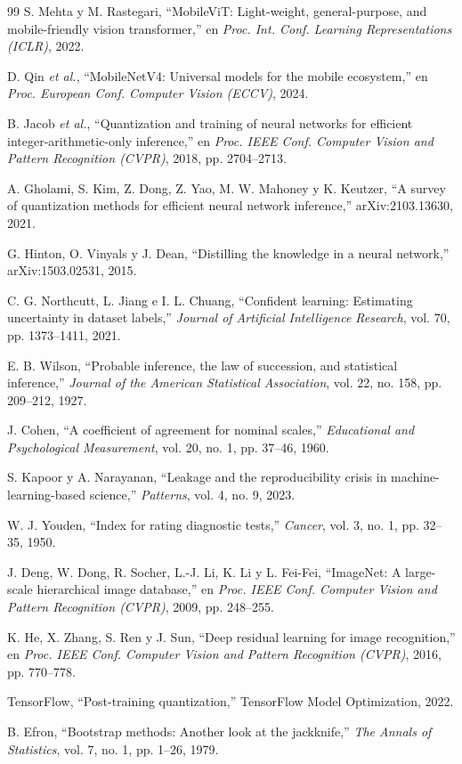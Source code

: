 \documentclass[conference]{IEEEtran}
\begin{document}
\begin{thebibliography}{99}
 S. Mehta y M. Rastegari, ``MobileViT: Light-weight, general-purpose, and mobile-friendly
vision transformer,'' en \emph{Proc. Int. Conf. Learning Representations (ICLR)}, 2022.

 D. Qin \emph{et al.}, ``MobileNetV4: Universal models for the mobile ecosystem,'' en \emph{Proc.
European Conf. Computer Vision (ECCV)}, 2024.

 B. Jacob \emph{et al.}, ``Quantization and training of neural networks for efficient
integer-arithmetic-only inference,'' en \emph{Proc. IEEE Conf. Computer Vision and Pattern Recognition (CVPR)},
2018, pp. 2704--2713.

 A. Gholami, S. Kim, Z. Dong, Z. Yao, M. W. Mahoney y K. Keutzer, ``A survey of quantization
methods for efficient neural network inference,'' arXiv:2103.13630, 2021.

 G. Hinton, O. Vinyals y J. Dean, ``Distilling the knowledge in a neural network,''
arXiv:1503.02531, 2015.

 C. G. Northcutt, L. Jiang e I. L. Chuang, ``Confident learning: Estimating uncertainty in
dataset labels,'' \emph{Journal of Artificial Intelligence Research}, vol. 70, pp. 1373--1411, 2021.

 E. B. Wilson, ``Probable inference, the law of succession, and statistical inference,''
\emph{Journal of the American Statistical Association}, vol. 22, no. 158, pp. 209--212, 1927.

 J. Cohen, ``A coefficient of agreement for nominal scales,'' \emph{Educational and
Psychological Measurement}, vol. 20, no. 1, pp. 37--46, 1960.

 S. Kapoor y A. Narayanan, ``Leakage and the reproducibility crisis in
machine-learning-based science,'' \emph{Patterns}, vol. 4, no. 9, 2023.

 W. J. Youden, ``Index for rating diagnostic tests,'' \emph{Cancer}, vol. 3, no. 1,
pp. 32--35, 1950.

 J. Deng, W. Dong, R. Socher, L.-J. Li, K. Li y L. Fei-Fei, ``ImageNet: A large-scale
hierarchical image database,'' en \emph{Proc. IEEE Conf. Computer Vision and Pattern Recognition (CVPR)}, 2009,
pp. 248--255.

 K. He, X. Zhang, S. Ren y J. Sun, ``Deep residual learning for image recognition,'' en
\emph{Proc. IEEE Conf. Computer Vision and Pattern Recognition (CVPR)}, 2016, pp. 770--778.

 TensorFlow, ``Post-training quantization,'' TensorFlow Model Optimization, 2022.

 B. Efron, ``Bootstrap methods: Another look at the jackknife,'' \emph{The Annals of
Statistics}, vol. 7, no. 1, pp. 1--26, 1979.

\end{thebibliography}
\end{document}
